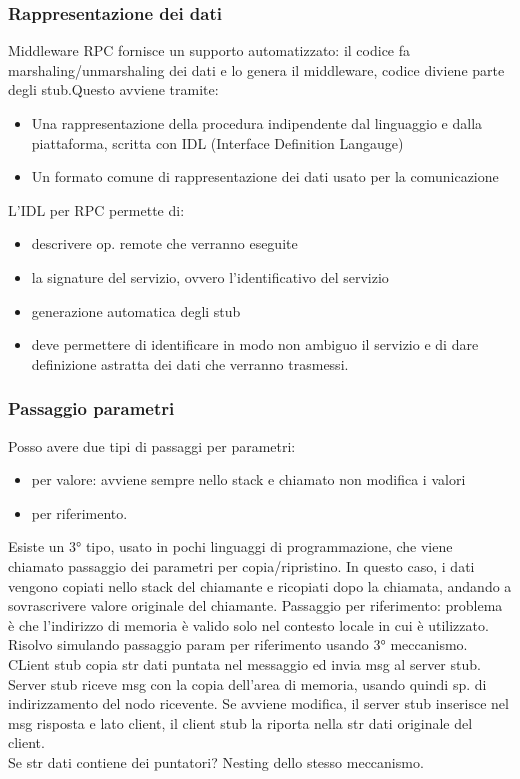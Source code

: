 \documentclass{article}
\begin{document}
\subsubsection{Rappresentazione dei dati}
Middleware RPC fornisce un supporto automatizzato: il codice fa marshaling/unmarshaling dei dati e lo genera il middleware, codice diviene parte degli stub.Questo avviene tramite:
\begin{itemize}
\item Una rappresentazione della procedura indipendente dal linguaggio e dalla piattaforma, scritta con IDL (Interface Definition Langauge)
\item Un formato comune di rappresentazione dei dati usato per la comunicazione
\end{itemize}
L'IDL per RPC permette di:
\begin{itemize}
\item descrivere op. remote che verranno eseguite
\item la signature del servizio, ovvero l'identificativo del servizio
\item generazione automatica degli stub
\item deve permettere di identificare in modo non ambiguo il servizio e di dare definizione astratta dei dati che verranno trasmessi.
\end{itemize}
\subsubsection{Passaggio parametri}
Posso avere due tipi di passaggi per parametri: 
\begin{itemize}
\item per valore: avviene sempre nello stack e chiamato non modifica i valori
\item per riferimento.
\end{itemize}
Esiste un 3° tipo, usato in pochi linguaggi di programmazione, che viene chiamato passaggio dei parametri per copia/ripristino. In questo caso, i dati vengono copiati nello stack del chiamante e ricopiati dopo la chiamata, andando a sovrascrivere valore originale del chiamante. Passaggio per riferimento: problema è che l'indirizzo di memoria è valido solo nel contesto locale in cui è utilizzato. Risolvo simulando passaggio param per riferimento usando 3° meccanismo. CLient stub copia str dati puntata nel messaggio ed invia msg al server stub. Server stub riceve msg con la copia dell'area di memoria, usando quindi sp. di indirizzamento del nodo ricevente. Se avviene modifica, il server stub inserisce nel msg risposta e lato client, il client stub la riporta nella str dati originale del client.\\ Se str dati contiene dei puntatori? Nesting dello stesso meccanismo.
\end{document}

